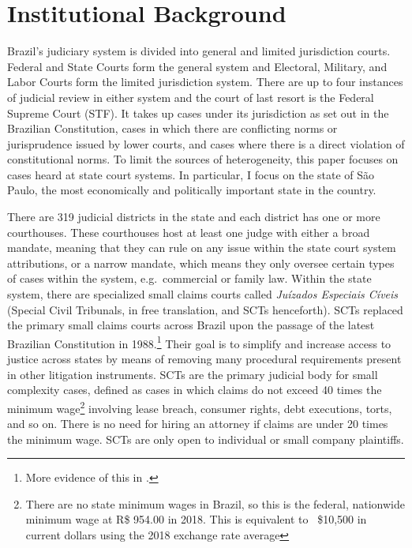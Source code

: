 \documentclass[11pt]{article}
\begin{document}
\section{Institutional Background} \label{sec:background_paper2}

Brazil's judiciary system is divided into general and limited jurisdiction courts. Federal and State Courts form the general system and Electoral, Military, and Labor Courts form the limited jurisdiction system. There are up to four instances of judicial review in either system and the court of last resort is the Federal Supreme Court (STF). It takes up cases under its jurisdiction as set out in the Brazilian Constitution, cases in which there are conflicting norms or jurisprudence issued by lower courts, and cases where there is a direct violation of constitutional norms. To limit the sources of heterogeneity, this paper focuses on cases heard at state court systems. In particular, I focus on the state of São Paulo, the most economically and politically important state in the country.

There are 319 judicial districts in the state and each district has one or more courthouses. These courthouses host at least one judge with either a broad mandate, meaning that they can rule on any issue within the state court system attributions, or a narrow mandate, which means they only oversee certain types of cases within the system, e.g.~commercial or family law. Within the state system, there are specialized small claims courts called \emph{Juízados Especiais Cíveis} (Special Civil Tribunals, in free translation, and SCTs henceforth). SCTs replaced the primary small claims courts across Brazil upon the passage of the latest Brazilian Constitution in 1988.\footnote{More evidence of this in \citet{LichandAccessJusticeEntrepreneurship2014}.} Their goal is to simplify and increase access to justice across states by means of removing many procedural requirements present in other litigation instruments. SCTs are the primary judicial body for small complexity cases, defined as cases in which claims do not exceed 40 times the minimum wage\footnote{There are no state minimum wages in Brazil, so this is the federal, nationwide minimum wage at R\$ 954.00 in 2018. This is equivalent to ~\$10,500 in current dollars using the 2018 exchange rate average} involving lease breach, consumer rights, debt executions, torts, and so on. There is no need for hiring an attorney if claims are under 20 times the minimum wage. SCTs are only open to individual or small company plaintiffs.
\end{document}
